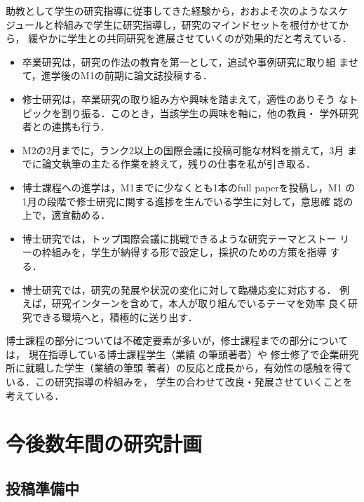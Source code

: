 \documentclass[dvipdfmx]{jsarticle}
\begin{document}
助教として学生の研究指導に従事してきた経験から，おおよそ次のようなスケ
ジュールと枠組みで学生に研究指導し，研究のマインドセットを根付かせてから，
緩やかに学生との共同研究を進展させていくのが効果的だと考えている．
\begin{itemize}
 \item 卒業研究は，研究の作法の教育を第一として，追試や事例研究に取り組
       ませて，進学後のM1の前期に論文誌投稿する．

 \item 修士研究は，卒業研究の取り組み方や興味を踏まえて，適性のありそう
       なトピックを割り振る．このとき，当該学生の興味を軸に，他の教員・
       学外研究者との連携も行う．

 \item M2の2月までに，ランク2以上の国際会議に投稿可能な材料を揃えて，3月
       までに論文執筆の主たる作業を終えて，残りの仕事を私が引き取る．

 \item 博士課程への進学は，M1までに少なくとも1本のfull paperを投稿し，M1
       の1月の段階で修士研究に関する進捗を生んでいる学生に対して，意思確
       認の上で，適宜勧める．

 \item 博士研究では，トップ国際会議に挑戦できるような研究テーマとストー
       リーの枠組みを，学生が納得する形で設定し，採択のための方策を指導
       する．

 \item 博士研究では，研究の発展や状況の変化に対して臨機応変に対応する．
       例えば，研究インターンを含めて，本人が取り組んでいるテーマを効率
       良く研究できる環境へと，積極的に送り出す．
\end{itemize}
博士課程の部分については不確定要素が多いが，修士課程までの部分については，
現在指導している博士課程学生（業績
\cite{pro22o:far_memory,jip22:argodsm,ppl23c3:far_memory}の筆頭著者）や
修士修了で企業研究所に就職した学生（業績\cite{ppl22:sfa,ppl23c3:otf_sfa}の筆頭
著者）の反応と成長から，有効性の感触を得ている．この研究指導の枠組みを，
学生の合わせて改良・発展させていくことを考えている．

\section*{今後数年間の研究計画}

\subsection*{投稿準備中}
\end{document}
